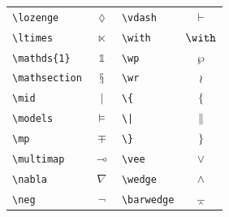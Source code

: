 \begin{longtable}{lc|lc}
\verb+\lozenge+ & $\lozenge$ &\verb+\vdash+ & $\vdash$\\
\verb+\ltimes+ & $\ltimes$ &\verb+\with+ & $\with$\\
\verb+\mathds{1}+ & $\mathds{1}$ &\verb+\wp+ & $\wp$\\
\verb+\mathsection+ & $\mathsection$ &\verb+\wr+ & $\wr$\\
\verb+\mid+ & $\mid$ &\verb+\{+ & $\{$\\
\verb+\models+ & $\models$ &\verb+\|+ & $\|$\\
\verb+\mp+ & $\mp$ &\verb+\}+ & $\}$\\
\verb+\multimap+ & $\multimap$ &\verb+\vee+ & $\vee$\\
\verb+\nabla+ & $\nabla$ &\verb+\wedge+ & $\wedge$\\
\verb+\neg+ & $\neg$ &\verb+\barwedge+ & $\barwedge$
    \label{table:symbols-of-db-0}
    \end{longtable}


